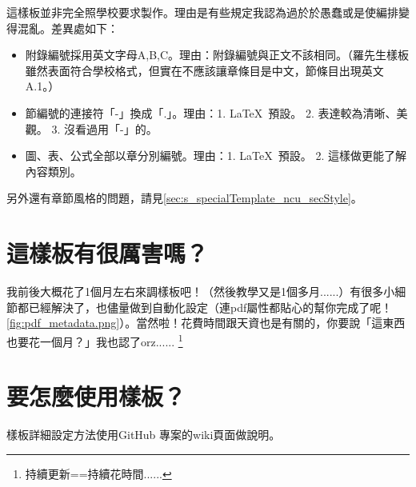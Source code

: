 \documentclass[class=NCU_thesis, crop=false, float=true]{standalone}
\begin{document}
這樣板並非完全照學校要求製作。理由是有些規定我認為過於於愚蠢或是使編排變得混亂。差異處如下：
\begin{itemize}
    \item 附錄編號採用英文字母A,B,C。理由：附錄編號與正文不該相同。（羅先生樣板雖然表面符合學校格式，但實在不應該讓章條目是中文，節條目出現英文A.1。）
    \item 節編號的連接符「-」換成「.」。理由：1. \LaTeX\ 預設。 2. 表達較為清晰、美觀。 3. 沒看過用「-」的。
    \item 圖、表、公式全部以章分別編號。理由：1. \LaTeX\ 預設。 2. 這樣做更能了解內容類別。
\end{itemize}
另外還有章節風格的問題，請見\cref{sec:s_specialTemplate_ncu_secStyle}。

\section{這樣板有很厲害嗎？}
我前後大概花了1個月左右來調樣板吧！（然後教學又是1個多月......）有很多小細節都已經解決了，也儘量做到自動化設定（連pdf屬性都貼心的幫你完成了呢！\cref{fig:pdf_metadata.png}）。當然啦！花費時間跟天資也是有關的，你要說「這東西也要花一個月？」我也認了orz......
\footnote{持續更新==持續花時間......}

\section{要怎麼使用樣板？}
{\color{red}
    樣板詳細設定方法使用GitHub 專案的wiki頁面做說明。
}
\end{document}
